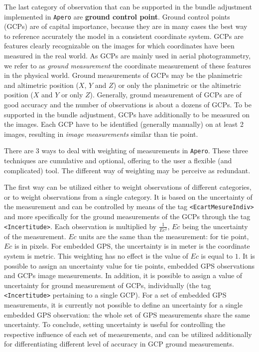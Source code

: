 The last category of observation that can be supported in the bundle adjustment implemented in {\tt Apero} are {\bf ground control point}.
Ground control points (GCPs) are of capital importance, because they are in many cases the best way to reference accurately the model in a consistent coordinate system.
GCPs are features clearly recognizable on the images for which coordinates have been measured in the real world.
As GCPs are mainly used in aerial photogrammetry, we refer to as {\it ground measurement}  the coordinate measurement of these features in the physical world.
Ground measurements of GCPs may be the planimetric and altimetric position ($X$, $Y$ and $Z$) or only the planimetric or the altimetric position ($X$ and $Y$ or only $Z$).
Generally, ground measurement of GCPs are of good accuracy and the number of observations is about a dozens of GCPs.
To be supported in the bundle adjustment, GCPs have additionally to be measured on the images.
Each GCP have to be identified (generally manually) on at least 2 images, resulting in {\it image measurements} similar than tie point.

There are 3 ways to deal with weighting of measurements in {\tt Apero}.
These three techniques are cumulative and optional, offering to the user a flexible (and complicated) tool.
The different way of weighting may be perceive as redundant.

The first way can be utilized either to weight observations of different categories, or to weight observations from a single category.
It is based on the uncertainty of the measurement and can be controlled by means of the tag {\tt <EcartMesureIndiv>} and more specifically for the ground measurements of the GCPs through the tag {\tt <Incertitude>}.
Each observation is multiplied by $\frac1{Ec^2}$, $Ec$ being the uncertainty of the measurement.
$Ec$ units are the same than the measurement: for tie point, $Ec$ is in pixels.
For embedded GPS, the uncertainty is in meter is the coordinate system is metric.
This weighting has no effect is the value of $Ec$ is equal to $1$.
It is possible to assign an uncertainty value for tie points, embedded GPS observations and GCPs image measurements.
In addition, it is possible to assign a value of uncertainty for ground measurement of GCPs, individually (the tag {\tt <Incertitude>} pertaining to a single GCP).
For a set of embedded GPS measurements, it is currently not possible to define an uncertainty for a single embedded GPS observation: the whole set of GPS measurements share the same uncertainty.
To conclude, setting uncertainty is useful for controlling the respective influence of each set of measurements, and can be utilized additionally for differentiating different level of accuracy in GCP ground measurements.


